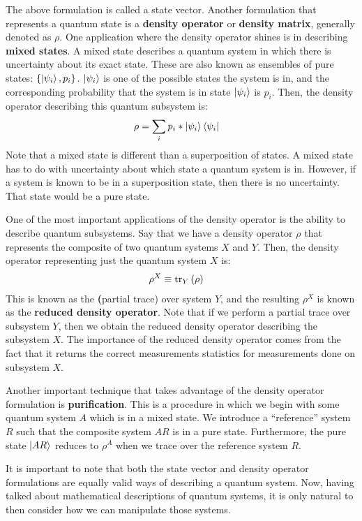 The above formulation is called a state vector. Another formulation that represents a quantum state is a \textbf{density operator} or \textbf{density matrix}, generally denoted as $\rho$. One application where the density operator shines is in describing \textbf{mixed states}. A mixed state describes a quantum system in which there is uncertainty about its exact state. These are also known as ensembles of pure states: $\{\ket{\psi_i}, p_i\}$. $\ket{\psi_i}$ is one of the possible states the system is in, and the corresponding probability that the system is in state $\ket{\psi_i}$ is $p_i$. Then, the density operator describing this quantum subsystem is:
\begin{align}
    \rho &= \sum_{i} p_i * \ket{\psi_i}\bra{\psi_i}
\end{align}
Note that a mixed state is different than a superposition of states. A mixed state has to do with uncertainty about which state a quantum system is in. However, if a system is known to be in a superposition state, then there is no uncertainty. That state would be a pure state.

One of the most important applications of the density operator is the ability to describe quantum subsystems. Say that we have a density operator $\rho$ that represents the composite of two quantum systems $X$ and $Y$. Then, the density operator representing just the quantum system $X$ is:
\begin{align}
    \rho^X &\equiv \trace[Y]{\rho}
\end{align}
This is known as the \textbf(partial trace) over system $Y$, and the resulting $\rho^X$ is known as the \textbf{reduced density operator}. Note that if we perform a partial trace over subsystem $Y$, then we obtain the reduced density operator describing the subsystem $X$. The importance of the reduced density operator comes from the fact that it returns the correct measurements statistics for measurements done on subsystem $X$.

Another important technique that takes advantage of the density operator formulation is \textbf{purification}. This is a procedure in which we begin with some quantum system $A$ which is in a mixed state. We introduce a ``reference'' system $R$ such that the composite system $AR$ is in a pure state. Furthermore, the pure state $\ket{AR}$ reduces to $\rho^A$ when we trace over the reference system $R$.

It is important to note that both the state vector and density operator formulations are equally valid ways of describing a quantum system. Now, having talked about mathematical descriptions of quantum systems, it is only natural to then consider how we can manipulate those systems. 

